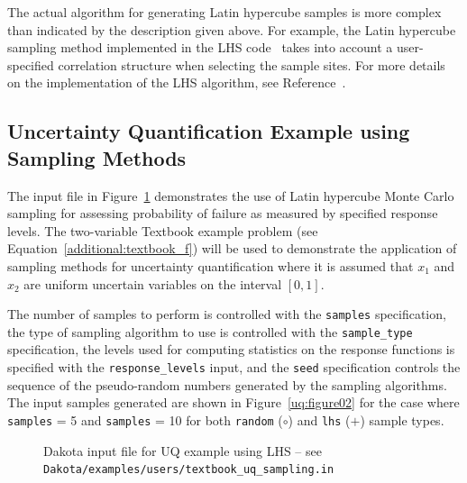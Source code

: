 The actual algorithm for generating Latin hypercube samples is more
complex than indicated by the description given above. For example,
the Latin hypercube sampling method implemented in the LHS
code~\cite{Swi04} takes into account a user-specified correlation
structure when selecting the sample sites. For more details on the
implementation of the LHS algorithm, see Reference~\cite{Swi04}.

\subsection{Uncertainty Quantification Example using Sampling Methods}\label{uq:uncertainty1}

The input file in Figure~\ref{uq:figure01} 
demonstrates the use of Latin hypercube Monte Carlo sampling for
assessing probability of failure as measured by specified response
levels.  The two-variable Textbook example problem (see
Equation~\ref{additional:textbook_f}) will be used to demonstrate
the application of sampling methods for uncertainty quantification
where it is assumed that $x_1$ and $x_2$ are uniform uncertain
variables on the interval $[0,1]$. 

The number of samples to
perform is controlled with the \texttt{samples} specification, the
type of sampling algorithm to use is controlled with the
\texttt{sample\_type} specification, the levels used for computing
statistics on the response functions is specified with the
\texttt{response\_levels} input, and the \texttt{seed} specification
controls the sequence of the pseudo-random numbers generated by the
sampling algorithms. The input samples generated are shown in
Figure~\ref{uq:figure02} for the case where \texttt{samples} = 5 and
\texttt{samples} = 10 for both \texttt{random} ($\circ$) and 
\texttt{lhs} ($+$) sample types.

\begin{figure}[htbp!]
  \centering \begin{bigbox} \begin{small}
   \end{small} \end{bigbox}
\caption{Dakota input file for UQ example using LHS --
see \texttt{Dakota/examples/users/textbook\_uq\_sampling.in} }
\label{uq:figure01}
\end{figure}

